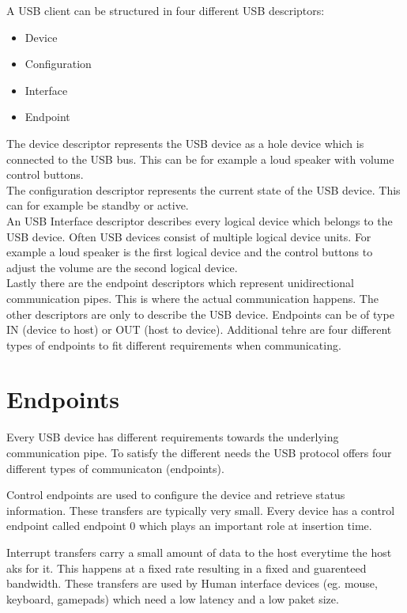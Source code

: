 A USB client can be structured in four different USB descriptors:

\begin{itemize}
\item Device
\item Configuration
\item Interface
\item Endpoint
\end{itemize}

The device descriptor represents the USB device as a hole device which is connected to the USB bus. This can be for example a loud speaker with volume control buttons.\\
The configuration descriptor represents the current state of the USB device. This can for example be standby or active.\\
An USB Interface descriptor describes every logical device which belongs to the USB device. Often USB devices consist of multiple logical device units. For example a loud speaker is the first logical device and the control buttons to adjust the volume are the second logical device.\\
Lastly there are the endpoint descriptors which represent unidirectional communication pipes. This is where the actual communication happens. The other descriptors are only to describe the USB device. Endpoints can be of type IN (device to host) or OUT (host to device). Additional tehre are four different types of endpoints to fit different requirements when communicating.\\

\section{Endpoints}

Every USB device has different requirements towards the underlying communication pipe. To satisfy the different needs the USB protocol offers four different types of communicaton (endpoints).

Control endpoints are used to configure the device and retrieve status information. These transfers are typically very small. Every device has a control endpoint called endpoint 0 which plays an important role at insertion time.

Interrupt transfers carry a small amount of data to the host everytime the host aks for it. This happens at a fixed rate resulting in a fixed and guarenteed bandwidth. These transfers are used by Human interface devices (eg. mouse, keyboard, gamepads) which need a low latency and a low paket size.

